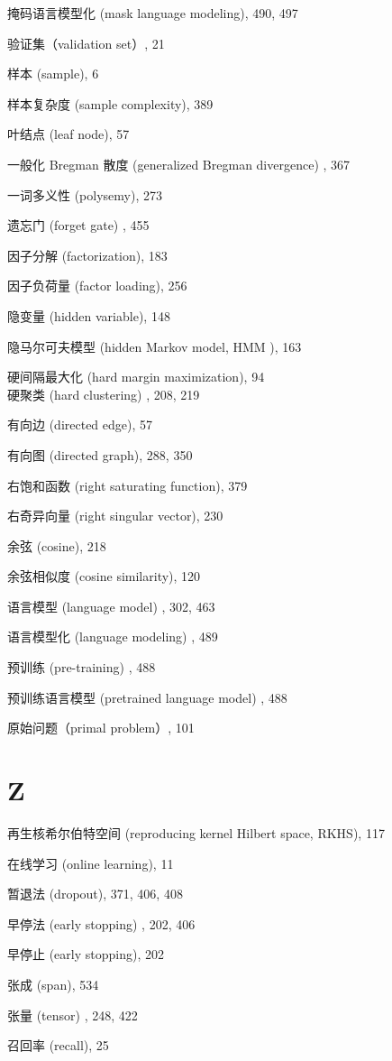 \documentclass[10pt]{article}
\begin{document}
掩码语言模型化 (mask language modeling), 490, 497

验证集（validation set）, 21

样本 (sample), 6

样本复杂度 (sample complexity), 389

叶结点 (leaf node), 57

一般化 Bregman 散度 (generalized Bregman divergence) , 367

一词多义性 (polysemy), 273

遗忘门 (forget gate) , 455

因子分解 (factorization), 183

因子负荷量 (factor loading), 256

隐变量 (hidden variable), 148

隐马尔可夫模型 (hidden Markov model, HMM ), 163

硬间隔最大化 (hard margin maximization), 94\\
硬聚类 (hard clustering) , 208, 219

有向边 (directed edge), 57

有向图 (directed graph), 288, 350

右饱和函数 (right saturating function), 379

右奇异向量 (right singular vector), 230

余弦 (cosine), 218

余弦相似度 (cosine similarity), 120

语言模型 (language model) , 302, 463

语言模型化 (language modeling) , 489

预训练 (pre-training) , 488

预训练语言模型 (pretrained language model) , 488

原始问题（primal problem）, 101

\section*{Z}
再生核希尔伯特空间 (reproducing kernel Hilbert space, RKHS), 117

在线学习 (online learning), 11

暂退法 (dropout), 371, 406, 408

早停法 (early stopping) , 202, 406

早停止 (early stopping), 202

张成 (span), 534

张量 (tensor) , 248, 422

召回率 (recall), 25
\end{document}
